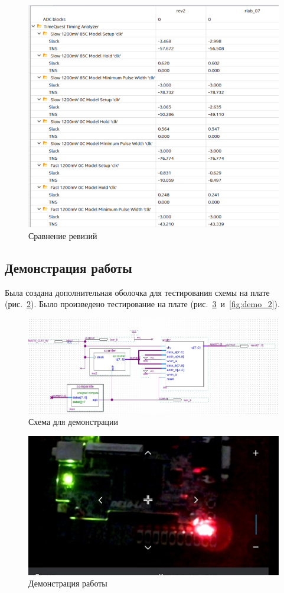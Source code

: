 \documentclass[a4paper,14pt]{article}
\begin{document}
\begin{figure}[H]
	\centering
	\includegraphics[width=0.8\linewidth]{image/diff}
	\caption{Сравнение ревизий}
	\label{fig:diff}
\end{figure}

\subsection{Демонстрация работы}

Была создана дополнительная оболочка для тестирования схемы на плате (рис.~\ref{fig:demo_schema}).
Было произведено тестирование на плате (рис.~\ref{fig:demo_1}~и~\ref{fig:demo_2}).

\begin{figure}[H]
	\centering
	\includegraphics[width=\linewidth]{image/demo_schema}
	\caption{Схема для демонстрации}
	\label{fig:demo_schema}
\end{figure}

\begin{figure}[H]
	\centering
	\includegraphics[width=0.8\linewidth]{image/demo_1}
	\caption{Демонстрация работы}
	\label{fig:demo_1}
\end{figure}
\end{document}
